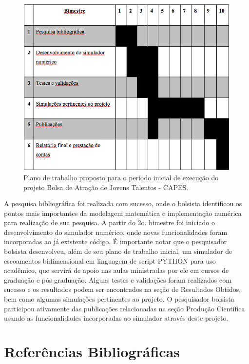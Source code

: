 \documentclass[a4paper,portuges]{article}
\begin{document}
 \begin{figure}[ht!]
 	\begin{center}
 		\includegraphics[angle=0, scale=0.5]{figs/plano.png}
 	\end{center}
 	\caption{Plano de trabalho proposto para o período inicial de
	execução do projeto Bolsa de Atração de Jovens Talentos - CAPES.}
 	\label{fig:plano} 
 \end{figure}

A pesquisa bibliográfica foi realizada com sucesso, onde o bolsista
identificou os pontos mais importantes da modelagem matemática e
implementação numérica para realização de sua pesquisa. A partir do 2o.
bimestre foi iniciado o desenvolvimento do simulador numérico, onde
novas funcionalidades foram incorporadas ao já existente código. É
importante notar que o pesquisador bolsista desenvolveu, além de seu
plano de trabalho inicial, um simulador de escoamentos bidimensional em
linguagem de script PYTHON para uso acadêmico, que servirá de apoio nas
aulas ministradas por ele em cursos de graduação e pós-graduação. Alguns
testes e validações foram realizados com sucesso e os resultados podem
ser encontrados na seção de Resultados Obtidos, bem como algumas
simulações pertinentes ao projeto. O pesquisador bolsista participou
ativamente das publicações relacionadas na seção Produção Científica
usando as funcionalidades incorporadas ao simulador através deste
projeto.

\section{Referências Bibliográficas}


\end{document}
